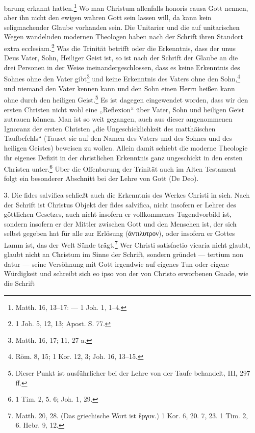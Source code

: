 barung erkannt hatten.\footnote{Matth. 16, 13--17: --- 1 Joh. 1, 1--4.} Wo man Christum allenfalls honoris causa Gott nennen, aber ihn nicht den ewigen wahren Gott sein lassen will, da kann kein seligmachender Glaube vorhanden sein. Die Unitarier und die auf unitarischen Wegen wandelnden modernen Theologen haben nach der Schrift ihren Standort extra ecclesiam.\footnote{1 Joh. 5, 12, 13; Apost. S. 77.} Was die Trinität betrifft oder die Erkenntnis, dass der unus Deus Vater, Sohn, Heiliger Geist ist, so ist nach der Schrift der Glaube an die drei Personen in der Weise ineinandergeschlossen, dass es keine Erkenntnis des Sohnes ohne den Vater gibt\footnote{Matth. 16, 17; 11, 27 a.} und keine Erkenntnis des Vaters ohne den Sohn,\footnote{Röm. 8, 15; 1 Kor. 12, 3; Joh. 16, 13--15.} und niemand den Vater kennen kann und den Sohn einen Herrn heißen kann ohne durch den heiligen Geist.\footnote{Dieser Punkt ist ausführlicher bei der Lehre von der Taufe behandelt, III, 297 ff.} Es ist dagegen eingewendet worden, dass wir den ersten Christen nicht wohl eine „Reflexion“ über Vater, Sohn und heiligen Geist zutrauen können. Man ist so weit gegangen, auch aus dieser angenommenen Ignoranz der ersten Christen „die Ungeschicklichkeit des matthäischen Taufbefehls“ (Tauset sie auf den Namen des Vaters und des Sohnes und des heiligen Geistes) beweisen zu wollen. Allein damit schiebt die moderne Theologie ihr eigenes Defizit in der christlichen Erkenntnis ganz ungeschickt in den ersten Christen unter.\footnote{1 Tim. 2, 5. 6; Joh. 1, 29.} Über die Offenbarung der Trinität auch im Alten Testament folgt ein besonderer Abschnitt bei der Lehre von Gott (De Deo).\par 3. Die fides salvifica schließt auch die Erkenntnis des Werkes Christi in sich. Nach der Schrift ist Christus Objekt der fides salvifica, nicht insofern er Lehrer des göttlichen Gesetzes, auch nicht insofern er vollkommenes Tugendvorbild ist, sondern insofern er der Mittler zwischen Gott und den Menschen ist, der sich selbst gegeben hat für alle zur Erlösung (ἀντιλυτρον), oder insofern er Gottes Lamm ist, das der Welt Sünde trägt.\footnote{Matth. 20, 28. (Das griechische Wort ist ἔργον.) 1 Kor. 6, 20. 7, 23. 1 Tim. 2, 6. Hebr. 9, 12.} Wer Christi satisfactio vicaria nicht glaubt, glaubt nicht an Christum im Sinne der Schrift, sondern gründet --- tertium non datur --- seine Versöhnung mit Gott irgendwie auf eigenes Tun oder eigene Würdigkeit und schreibt sich eo ipso von der von Christo erworbenen Gnade, wie die Schrift